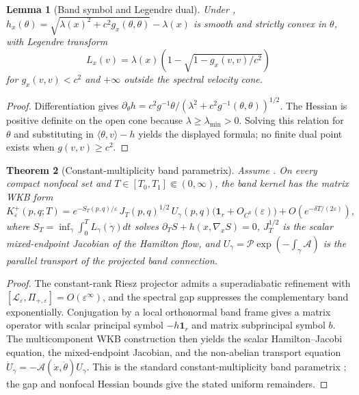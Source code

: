 \documentclass[11pt]{article}
\newtheorem{theorem}{Theorem}[section]
\newtheorem{lemma}[theorem]{Lemma}
\theoremstyle{definition}
\theoremstyle{remark}
\newcommand{\eps}{\varepsilon}
\begin{document}
\begin{lemma}[Band symbol and Legendre dual]
\label{lem:band-legendre}
Under ,
$h_x(\theta)=\sqrt{\lambda(x)^2+c^2g_x(\theta,\theta)}-\lambda(x)$ is smooth and
strictly convex in $\theta$, with Legendre transform
\[
 L_x(v)=\lambda(x)\left(1-\sqrt{1-g_x(v,v)/c^2}\right)
\]
for $g_x(v,v)<c^2$ and $+\infty$ outside the spectral velocity cone.
\end{lemma}

\begin{proof}
Differentiation gives
$\partial_\theta h=c^2g^{-1}\theta/(\lambda^2+c^2g^{-1}(\theta,\theta))^{1/2}$.
The Hessian is positive definite on the open cone because
$\lambda\ge\lambda_{\min}>0$.  Solving this relation for $\theta$ and substituting
in $\langle\theta,v\rangle-h$ yields the displayed formula; no finite dual point
exists when $g(v,v)\ge c^2$.
\end{proof}

\begin{theorem}[Constant-multiplicity band parametrix]
\label{thm:matrix-wkb}
Assume .  On every compact nonfocal set and
$T\in[T_0,T_1]\Subset(0,\infty)$, the band kernel has the matrix WKB form
\[
 K^+_\eps(p,q;T)=e^{-S_T(p,q)/\eps}\,
 J_T(p,q)^{1/2}\,U_\gamma(p,q)
 \bigl(\mathbf 1_r+O_{C^0}(\eps)\bigr)
 +O(e^{-\delta T/(2\eps)}),
\]
where $S_T=\inf_\gamma\int_0^T L_\gamma(\dot\gamma)dt$ solves
$\partial_TS+h(x,\nabla_xS)=0$, $J_T^{1/2}$ is the scalar mixed-endpoint
Jacobian of the Hamilton flow, and
$U_\gamma=\mathcal P\exp(-\int_\gamma\mathcal A)$ is the parallel transport of
the projected band connection.
\end{theorem}

\begin{proof}
The constant-rank Riesz projector admits a superadiabatic refinement with
$[\mathcal L_\eps,\Pi_{+,\eps}]=O(\eps^\infty)$, and the spectral gap suppresses
the complementary band exponentially.  Conjugation by a local orthonormal band
frame gives a matrix operator with scalar principal symbol $-h\mathbf 1_r$ and
matrix subprincipal symbol $b$.  The multicomponent WKB construction then yields
the scalar Hamilton--Jacobi equation, the mixed-endpoint Jacobian, and the
non-abelian transport equation
$\dot U_\gamma=-\mathcal A(\dot x,\dot\theta)U_\gamma$.
This is the standard constant-multiplicity band parametrix
\cite{LittlejohnFlynn,WilczekZee,EmmrichWeinstein,Teufel}; the gap and nonfocal
Hessian bounds give the stated uniform remainders.
\end{proof}
\end{document}

